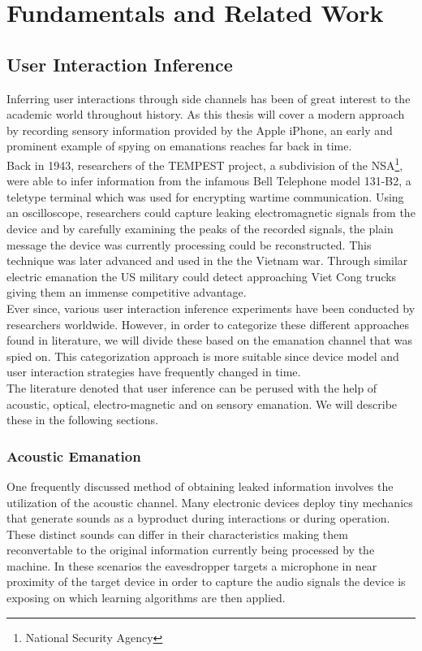 \chapter{Fundamentals and Related Work\label{cha:chapter2}}

\section{User Interaction Inference}
Inferring user interactions through side channels has been of great interest to the academic world throughout history. As this thesis will cover a modern approach by recording sensory information provided by the Apple iPhone, an early and prominent example of spying on emanations reaches far back in time. \\

Back in 1943, researchers of the TEMPEST project, a subdivision of the NSA\footnote{National Security Agency}, were able to infer information from the infamous Bell Telephone model 131-B2, a teletype terminal which was used for encrypting wartime communication. Using an oscilloscope, researchers could capture leaking electromagnetic signals from the device and by carefully examining the peaks of the recorded signals, the plain message the device was currently processing could be reconstructed. This technique was later advanced and used in the the Vietnam war. Through similar electric emanation the US military could detect approaching Viet Cong trucks giving them an immense competitive advantage. \\


Ever since, various user interaction inference experiments have been conducted by researchers worldwide. However, in order to categorize these different approaches found in literature, we will divide these based on the emanation channel that was spied on. This categorization approach is more suitable since device model and user interaction strategies have frequently changed in time.\\ 

The literature denoted that user inference can be perused with the help of acoustic, optical, electro-magnetic and on sensory emanation. We will describe these in the following sections.

\subsection{Acoustic Emanation}
One frequently discussed method of obtaining leaked information involves the utilization of the acoustic channel. Many electronic devices deploy tiny mechanics that generate sounds as a byproduct during interactions or during operation. These distinct sounds can differ in their characteristics making them reconvertable to the original information currently being processed by the machine. In these scenarios the eavesdropper targets a microphone in near proximity of the target device in order to capture the audio signals the device is exposing on which learning algorithms are then applied. \\


